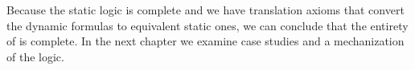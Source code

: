 Because the static logic is complete and we have translation axioms that convert the dynamic formulas to equivalent static ones, we can conclude that the entirety of \DASL is complete. In the next chapter we examine case studies and a mechanization of the logic.
%



